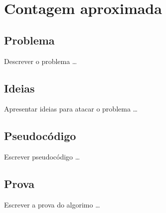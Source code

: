 \chapter{Contagem aproximada}
\label{chap:morris}

\section{Problema}

Descrever o problema \dots

\section{Ideias}

Apresentar ideias para atacar o problema \dots

\section{Pseudocódigo}

Escrever pseudocódigo \dots

\section{Prova}

Escrever a prova do algorimo \dots
